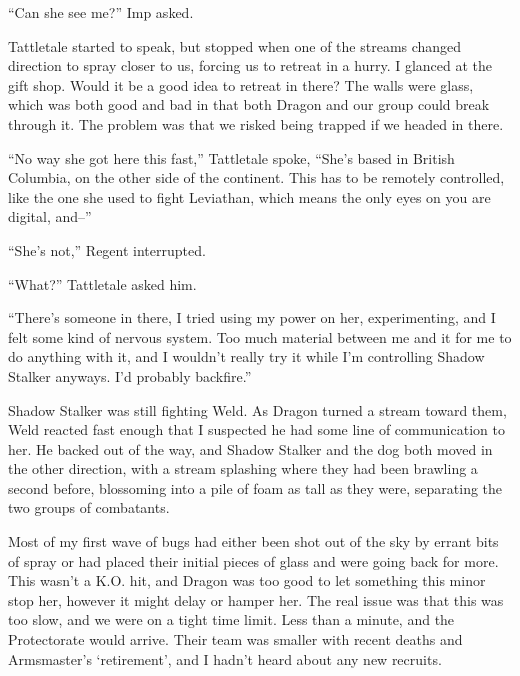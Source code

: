 ``Can she see me?'' Imp asked.



Tattletale started to speak, but stopped when one of the streams changed direction to spray closer to us, forcing us to retreat in a hurry.  I glanced at the gift shop.  Would it be a good idea to retreat in there?  The walls were glass, which was both good and bad in that both Dragon and our group could break through it.  The problem was that we risked being trapped if we headed in there.



``No way she got here this fast,'' Tattletale spoke, ``She's based in British Columbia, on the other side of the continent.  This has to be remotely controlled, like the one she used to fight Leviathan, which means the only eyes on you are digital, and--''



``She's not,'' Regent interrupted.



``What?'' Tattletale asked him.



``There's someone in there, I tried using my power on her, experimenting, and I felt some kind of nervous system.  Too much material between me and it for me to do anything with it, and I wouldn't really try it while I'm controlling Shadow Stalker anyways.  I'd probably backfire.''



Shadow Stalker was still fighting Weld.  As Dragon turned a stream toward them, Weld reacted fast enough that I suspected he had some line of communication to her.  He backed out of the way, and Shadow Stalker and the dog both moved in the other direction, with a stream splashing where they had been brawling a second before, blossoming into a pile of foam as tall as they were, separating the two groups of combatants.



Most of my first wave of bugs had either been shot out of the sky by errant bits of spray or had placed their initial pieces of glass and were going back for more.  This wasn't a K.O. hit, and Dragon was too good to let something this minor stop her, however it might delay or hamper her.  The real issue was that this was too slow, and we were on a tight time limit.  Less than a minute, and the Protectorate would arrive.  Their team was smaller with recent deaths and Armsmaster's `retirement', and I hadn't heard about any new recruits.



